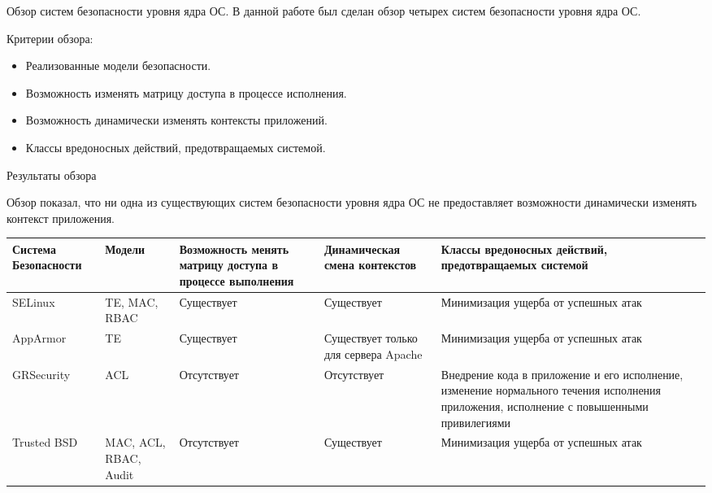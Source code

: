 \documentclass{beamer}
\begin{document}
\begin{frame}{Обзор систем безопасности уровня ядра ОС.}
В данной работе был сделан обзор четырех систем безопасности уровня ядра ОС.

\begin{block}{Критерии обзора:}

\begin{itemize}
 \item Реализованные модели безопасности.
 \item Возможность изменять матрицу доступа в процессе исполнения.
 \item Возможность динамически изменять контексты приложений.
 \item Классы вредоносных действий, предотвращаемых системой.
\end{itemize}
\end{block}
\end{frame}

\begin{frame}[fragile]{Результаты обзора}

Обзор показал, что ни одна из существующих систем безопасности
уровня ядра ОС не предоставляет возможности динамически изменять
контекст приложения.

\begin{tiny}
\begin{center}
\begin{tabular}{|p{1.5cm}|p{1.0cm}|p{2cm}|p{2cm}|p{3cm}|} 
\hline
Система Безопасности & Модели & Возможность менять матрицу 
доступа в процессе выполнения & 
Динамическая смена контекстов & Классы вредоносных действий,
предотвращаемых системой \\
\hline 
SELinux & TE, MAC, RBAC & Существует & Существует & 
Минимизация ущерба от успешных атак \\
\hline
AppArmor & TE & Существует & Существует только для сервера Apache & 
Минимизация ущерба от успешных атак \\ 
\hline 
GRSecurity & ACL & Отсутствует & Отсутствует & Внедрение кода в приложение 
и его исполнение, изменение нормального течения исполнения приложения, 
исполнение с повышенными привилегиями \\ 
\hline 
Trusted BSD & MAC, ACL, RBAC, Audit & Отсутствует & Существует & 
Минимизация ущерба от успешных атак \\ 
\hline
\end{tabular} 
\end{center} 
\end{tiny} 
 
\end{frame}
\end{document}
